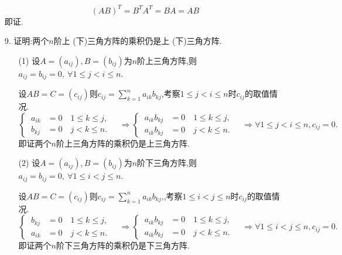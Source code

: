 \documentclass{article}
\begin{document}
\begin{enumerate}
        \[{(AB)}^{T}=B^{T} A^{T}=BA=AB\]即证.
        \item [9.]证明:两个$n$阶上 (下)三角方阵的乘积仍是上 (下)三角方阵.
        \begin{enumerate}
            \item [(1)]
            设$A=(a_{ij}),B=(b_{ij})$为$n$阶上三角方阵,则$a_{ij}=b_{ij}=0,\ \forall 1\leq j<i \leq n$.

            设$AB=C=(c_{ij})$则$c_{ij}=\displaystyle{\sum\limits_{k=1}^{n} a_{ik}b_{kj}}$,考察$1\leq j<i \leq n$时$c_{ij}$的取值情况.
            \[
                \begin{cases}
                    \ a_{ik}&=0 \quad 1\leq k \leq j,\\
                    \ b_{kj}&=0 \quad j < k \leq n.
                \end{cases}
                \quad \Rightarrow
                \begin{cases}
                    \ a_{ik}b_{kj}&=0 \quad 1\leq k \leq j,\\
                    \ a_{ik}b_{kj}&=0 \quad j < k \leq n.
                \end{cases}
                \quad \Rightarrow
                \forall 1\leq j<i \leq n,c_{ij}=0.
            \]
            即证两个$n$阶上三角方阵的乘积仍是上三角方阵.
            \item [(2)]
            设$A=(a_{ij}),B=(b_{ij})$为$n$阶下三角方阵,则$a_{ij}=b_{ij}=0,\ \forall 1\leq i<j \leq n$.

            设$AB=C=(c_{ij})$则$c_{ij}=\displaystyle{\sum\limits_{k=1}^{n} a_{ik}b_{kj}}$,,考察$1\leq i<j \leq n$时$c_{ij}$的取值情况.
            \[
                \begin{cases}
                    \  b_{kj}&=0 \quad 1\leq k \leq j,\\
                    \  a_{ik}&=0 \quad j < k \leq n.
                \end{cases}
                \quad \Rightarrow
                \begin{cases}
                    \ a_{ik}b_{kj}&=0 \quad 1\leq k \leq j,\\
                    \ a_{ik}b_{kj}&=0 \quad j < k \leq n.
                \end{cases}
                \quad \Rightarrow
                \forall 1\leq i<j \leq n,c_{ij}=0.
            \]
            即证两个$n$阶下三角方阵的乘积仍是下三角方阵.
        \end{enumerate}
    \end{enumerate}
\end{document}
